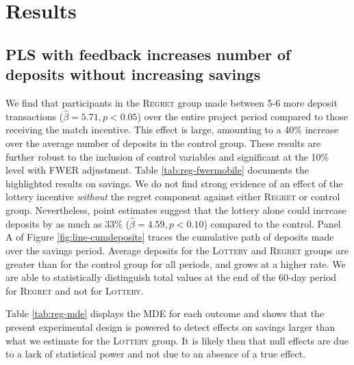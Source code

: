 \documentclass[11pt]{article}
\begin{document}

\section{Results} \label{sec:results}


	\subsection{PLS with feedback increases number of deposits without increasing savings}

		We find that participants in the \textsc{Regret} group made between 5-6 more deposit transactions ($\hat \beta = 5.71, p < 0.05$) over the entire project period compared to those receiving the match incentive. This effect is large, amounting to a 40\% increase over the average number of deposits in the control group. These results are further robust to the inclusion of control variables and significant at the 10\% level with FWER adjustment. Table \ref{tab:reg-fwermobile} documents the highlighted results on savings. We do not find strong evidence of an effect of the lottery incentive \textit{without} the regret component against either \textsc{Regret} or control group. Nevertheless, point estimates suggest that the lottery alone could increase deposits by as much as 33\% ($\hat \beta = 4.59, p < 0.10$) compared to the control. Panel A of Figure \ref{fig:line-cumdeposits} traces the cumulative path of deposits made over the savings period. Average deposits for the \textsc{Lottery} and \textsc{Regret} groups are greater than for the control group for all periods, and grows at a higher rate. We are able to statistically distinguish total values at the end of the 60-day period for \textsc{Regret} and not for \textsc{Lottery}.

		Table \ref{tab:reg-mde} displays the MDE for each outcome and shows that the present experimental design is powered to detect effects on savings larger than what we estimate for the \textsc{Lottery} group. It is likely then that null effects are due to a lack of statistical power and not due to an absence of a true effect.

\end{document}
